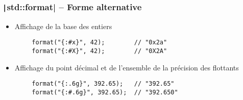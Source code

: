 \documentclass[C++.tex]{subfiles}
\begin{document}
\begin{frame}[fragile]
	\frametitle{\texttt|std::format| -- Forme alternative}
	\begin{itemize}
		\item Affichage de la base des entiers
	\end{itemize}

	\begin{verbatim}
		format("{:#x}", 42);        // "0x2a"
		format("{:#X}", 42);        // "0X2A"
	\end{verbatim}

	\begin{itemize}
		\item Affichage du point décimal et de l'ensemble de la précision des flottants
	\end{itemize}

	\begin{verbatim}
		format("{:.6g}", 392.65);   // "392.65"
		format("{:#.6g}", 392.65);  // "392.650"
	\end{verbatim}

\end{frame}
\end{document}
